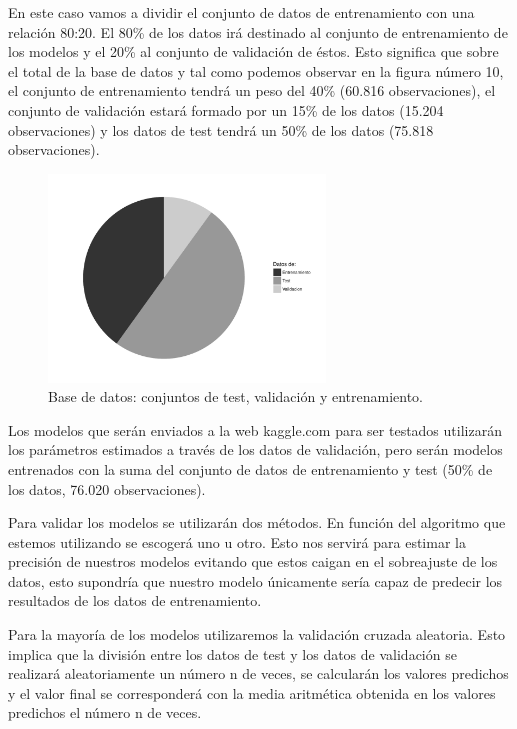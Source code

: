 \documentclass[11pt,a4paper,spanish]{article} %
\begin{document}
En este caso vamos a dividir el conjunto de datos de entrenamiento con una relación 80:20. El 80\% de los datos irá destinado al conjunto de entrenamiento de los modelos y el 20\% al conjunto de validación de éstos. Esto significa que sobre el total de la base de datos y tal como podemos observar en la figura número 10, el conjunto de entrenamiento tendrá un peso del 40\% (60.816 observaciones), el conjunto de validación estará formado por un 15\% de los datos (15.204 observaciones) y los datos de test tendrá un 50\% de los datos (75.818 observaciones). 

\begin{figure}[h!]
	\begin{center}
	\includegraphics[width=2.9in]{Z_01_10_Datos_test_entrenamiento_validacion.pdf}
    \caption{Base de datos: conjuntos de test, validación y entrenamiento.}
    \end{center}
\end{figure}

Los modelos que serán enviados a la web kaggle.com para ser testados utilizarán los parámetros estimados a través de los datos de validación, pero serán modelos entrenados con la suma del conjunto de datos de entrenamiento y test (50\% de los datos, 76.020 observaciones). 

Para validar los modelos se utilizarán dos métodos. En función del algoritmo que estemos utilizando se escogerá uno u otro. Esto nos servirá para estimar la precisión de nuestros modelos evitando que estos caigan en el sobreajuste de los datos, esto supondría que nuestro modelo únicamente sería capaz de predecir los resultados de los datos de entrenamiento.

Para la mayoría de los modelos utilizaremos la validación cruzada aleatoria. Esto implica que la división entre los datos de test y los datos de validación se realizará aleatoriamente un número n de veces, se calcularán los valores predichos y el valor final se corresponderá con la media aritmética obtenida en los valores predichos el número n de veces. 
\end{document}
